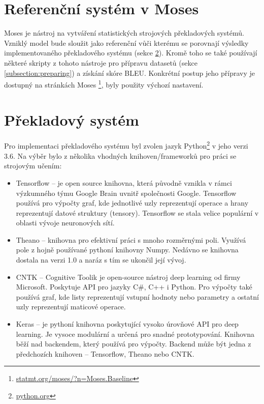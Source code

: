\section{Referenční systém v Moses}\label{section:referent}
Moses \cite{moses} je nástroj na vytváření statistických strojových překladových systémů. Vzniklý model bude sloužit jako referenční vůči kterému se porovnají výsledky implementovaného překladového systému (sekce \ref{section:nmtSystem}). Kromě toho se také používají některé skripty z tohoto nástroje pro přípravu datasetů (sekce \ref{subsection:preparing}) a získání skóre BLEU. Konkrétní postup jeho přípravy je dostupný na stránkách Moses \footnote{\url{statmt.org/moses/?n=Moses.Baseline}}, byly použity výchozí nastavení.

\section{Překladový systém}\label{section:nmtSystem}
Pro implementaci překladového systému byl zvolen jazyk Python\footnote{\url{python.org}} v jeho verzi 3.6. Na výběr bylo z několika vhodných knihoven/frameworků pro práci se strojovým učením:

\begin{itemize}
  \item Tensorflow -- je open source knihovna, která původně vznikla v rámci výzkumného týmu Google Brain uvnitř společnosti Google. Tensorflow používá pro výpočty graf, kde jednotlivé uzly reprezentují operace a hrany reprezentují datové struktury (tensory). Tensorflow se stala velice populární v oblasti vývoje neuronových sítí.
  \item Theano -- knihovna pro efektivní práci s mnoho rozměrnými poli. Využívá pole z hojně používané pythoní knihovny Numpy. Nedávno se knihovna dostala na verzi 1.0 a naráz s tím se ukončil její vývoj.
  \item CNTK -- Cognitive Toolik je open-source nástroj deep learning od firmy Microsoft. Poskytuje API pro jazyky C\#, C++ i Python. Pro výpočty také používá graf, kde listy reprezentují vstupní hodnoty nebo parametry a ostatní uzly reprezentují maticové operace.
  \item Keras -- je pythoní knihovna poskytující vysoko úrovňové API pro deep learning. Je vysoce modulární a určená pro snadné prototypování. Knihovna běží nad backendem, který používá pro výpočty. Backend může být jedna z předchozích knihoven -- Tensorflow, Theano nebo CNTK.
\end{itemize}


